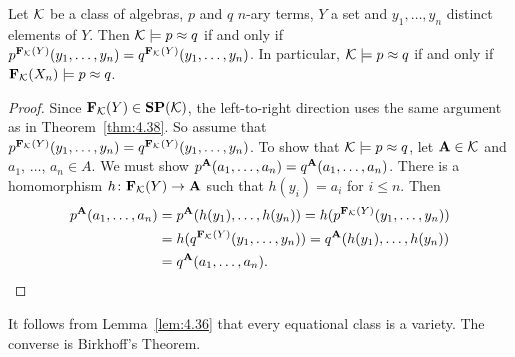 \begin{corollary}
  \label{cor:4.39} 
Let $\mathcal{K}$ be a class of algebras, $p$ and $q$ $n$-ary terms, $Y$ a set 
and $y_1, \dots, y_n$ distinct elements of $Y$. Then $\mathcal{K} \models p \approx q$ 
if and only if 
$p^{\mathbf{F}_{\mathcal{K}}(Y)}(y_1, \dots, y_n) = q^{\mathbf{F}_{\mathcal{K}}(Y)}(y_1, \dots, y_n)$.
In particular, $\mathcal{K} \models p \approx q$ if and only if 
$\mathbf{F}_{\mathcal{K}}(X_n)\models p \approx q$.
\end{corollary}
\begin{proof}
Since $\mathbf{F}_{\mathcal{K}}(Y)\in \mathbf{S}\mathbf{P}(\mathcal{K})$, the left-to-right 
direction uses the same argument as in Theorem~\ref{thm:4.38}. So assume 
that 
$p^{\mathbf{F}_{\mathcal{K}}(Y)}(y_1, \dots, y_n) = q^{\mathbf{F}_{\mathcal{K}}(Y)}(y_1, \dots, y_n)$.
To show that $\mathcal{K} \models p \approx q$, let 
$\mathbf{A} \in \mathcal{K}$ and $a_1$, $\dots$, $a_n \in A$. 
We must show $p^{\mathbf{A}}(a_1, \dots, a_n) = q^{\mathbf{A}}(a_1, \dots, a_n)$. 
There is a homomorphism $h\colon \mathbf{F}_{\mathcal{K}}(Y) \to \mathbf{A}$ 
such that $h(y_i) = a_i$ for $i \leq n$. Then
\begin{align*}
 p^{\mathbf{A}}(a_1, \dots, a_n) &= p^{\mathbf{A}}(h (y_1), \dots, h (y_n))
= h(p^{\mathbf{F}_{\mathcal{K}}(Y)}(y_1, \dots, y_n))\\
&= h(q^{\mathbf{F}_{\mathcal{K}}(Y)}(y_1, \dots, y_n))
= q^{\mathbf{A}}(h(y_1), \dots, h(y_n))\\
&= q^{\mathbf{A}}(a_1, \dots, a_n).
\end{align*}

\end{proof}

It follows from Lemma~\ref{lem:4.36} that every equational class is a variety. 
The converse is Birkhoff's Theorem.

